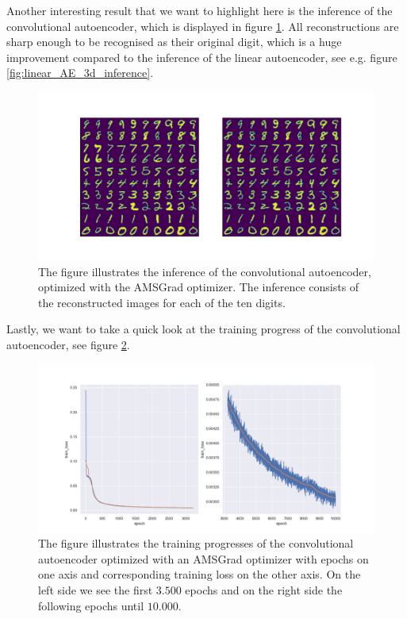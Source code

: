 Another interesting result that we want to highlight here is the inference of the convolutional autoencoder, which is displayed in figure \ref{fig:convolutional_AE_inference}. All reconstructions are sharp enough to be recognised as their original digit, which is a huge improvement compared to the inference of the linear autoencoder, see e.g. figure \ref{fig:linear_AE_3d_inference}.


\begin{figure}
\begin{center}
\includegraphics[width=0.7\linewidth]{convolutional_AE_inference}
\end{center}
\caption{The figure illustrates the inference of the convolutional autoencoder, optimized with the AMSGrad optimizer. The inference consists of the reconstructed images for each of the ten digits.}\label{fig:convolutional_AE_inference}
\end{figure}


Lastly, we want to take a quick look at the training progress of the convolutional autoencoder, see figure \ref{fig:convolutional_AE_training_progress}.

\begin{figure}
\begin{center}
\includegraphics[width=\linewidth]{convolutional_AE_training_progress}
\end{center}
\caption{The figure illustrates the training progresses of the convolutional autoencoder optimized with an AMSGrad optimizer  with epochs on one axis and corresponding training loss on the other axis. On the left side we see the first $3.500$ epochs and on the right side the following epochs until $10.000$.}\label{fig:convolutional_AE_training_progress}
\end{figure}
